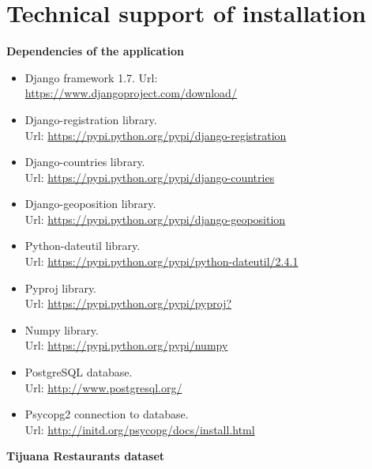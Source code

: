 \chapter{Technical support of installation}\label{appendixc}
\textbf{\large{Dependencies of the application}}
\begin{itemize}
\item Django framework 1.7. Url: \\
\url{https://www.djangoproject.com/download/}
\item Django-registration library. \\
Url: \url{https://pypi.python.org/pypi/django-registration}
\item Django-countries library. \\
Url: \url{https://pypi.python.org/pypi/django-countries}
\item Django-geoposition library. \\
Url: \url{https://pypi.python.org/pypi/django-geoposition}
\item Python-dateutil library. \\
Url: \url{https://pypi.python.org/pypi/python-dateutil/2.4.1}
\item Pyproj library. \\
Url: \url{https://pypi.python.org/pypi/pyproj?}
\item Numpy library. \\
Url: \url{https://pypi.python.org/pypi/numpy}
\item PostgreSQL database. 
\\Url: \url{http://www.postgresql.org/}
\item Psycopg2 connection to database. \\
Url: \url{http://initd.org/psycopg/docs/install.html}
\end{itemize}
\textbf{\large{Tijuana Restaurants dataset}}

